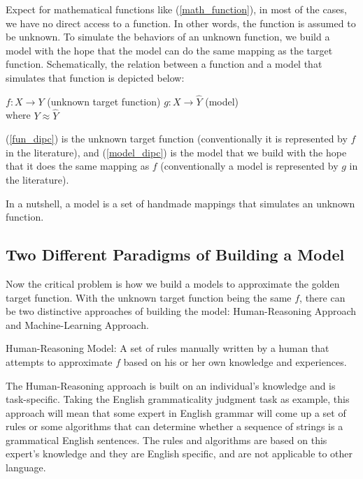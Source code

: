 Expect for mathematical functions like (\ref{math_function}), in most of the cases, we have no direct access to a function. In other words, the function is assumed to be unknown. 
To simulate the behaviors of an unknown function, we build a model with the hope that the model can do the same mapping as the target function.     
Schematically, the relation between a function and a model that simulates that function is depicted below:

\begin{exe}
\ex 
	\begin{xlist}
	\ex \label{fun_dipc} $f: X \rightarrow Y$ (unknown target function)
	\ex \label{model_dipc}$g: X \rightarrow \hat{Y}$ (model)\\
	where $Y \approx \hat{Y}$ 
	\end{xlist}
\end{exe}

(\ref{fun_dipc}) is the unknown target function (conventionally it is represented by $f$ in the literature), and (\ref{model_dipc}) is the model that we build with the hope that it does the same mapping as $f$ (conventionally a model is represented by $g$ in the literature).

In a nutshell, a model is a set of handmade mappings that simulates an unknown function. 

\subsection{Two Different Paradigms of Building a Model}

Now the critical problem is how we build a models to approximate the golden target function. With the unknown target function being the same $f$, there can be two distinctive approaches of building the model: Human-Reasoning Approach and Machine-Learning Approach. 

\begin{exe}
\ex Human-Reasoning Model:
A set of rules manually written by a human that attempts to approximate $f$ based on his or her own knowledge and experiences. 
\end{exe}

The Human-Reasoning approach is built on an individual's knowledge and is task-specific. 
Taking the English grammaticality judgment task as example, this approach will mean that some expert in English grammar will come up a set of rules or some algorithms that can determine whether a sequence of strings is a grammatical English sentences. 
The rules and algorithms are based on this expert's knowledge and they are English specific, and are not applicable to other language.     



